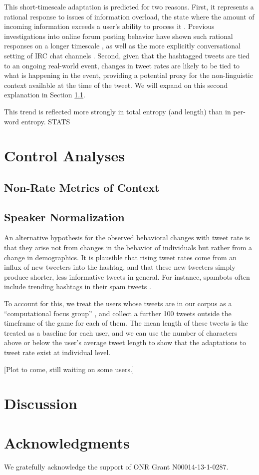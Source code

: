 \documentclass[11pt,letterpaper]{article}
\begin{document}
This short-timescale adaptation is predicted for two reasons. First, it represents a rational response to issues of information overload, the state where the amount of incoming information exceeds a user's ability to process it \cite{miller1956}.  Previous investigations into online forum posting behavior have shown such rational responses on a longer timescale \cite{jones2001a,jones2001b,whittaker2003,schoberth2003}, as well as the more explicitly conversational setting of IRC chat channels \cite{jones2008}.  Second, given that the hashtagged tweets are tied to an ongoing real-world event, changes in tweet rates are likely to be tied to what is happening in the event, providing a potential proxy for the non-linguistic context available at the time of the tweet. We will expand on this second explanation in Section \ref{sect:other-metrics}.

This trend is reflected more strongly in total entropy (and length) than in per-word entropy. STATS

\section{Control Analyses}

\subsection{Non-Rate Metrics of Context}\label{sect:other-metrics}

\subsection{Speaker Normalization}

An alternative hypothesis for the observed behavioral changes with tweet rate is that they arise not from changes in the behavior of individuals but rather from a change in demographics.  It is plausible that rising tweet rates come from an influx of new tweeters into the hashtag, and that these new tweeters simply produce shorter, less informative tweets in general.  For instance, spambots often include trending hashtags in their spam tweets \cite{martinez2013}.

To account for this, we treat the users whose tweets are in our corpus as a ``computational focus group'' \cite{lin2013,lin2014}, and collect a further 100 tweets outside the timeframe of the game for each of them.  The mean length of these tweets is the treated as a baseline for each user, and we can use the number of characters above or below the user's average tweet length to show that the adaptations to tweet rate exist at individual level.

[Plot to come, still waiting on some users.]



\section{Discussion}


\section*{Acknowledgments}

We gratefully acknowledge the support of ONR Grant N00014-13-1-0287.



\end{document}
